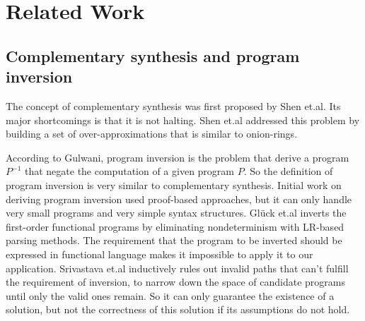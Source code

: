 \documentclass{acm_proc_article-sp}
\begin{document}


\section{Related Work}\label{sec_relwork}
\subsection{Complementary synthesis and program inversion}
The concept of complementary synthesis was first proposed by Shen et.al\cite{ShengYuShen:iccad09,ShengYuShen:tcad}.
Its major shortcomings is that it is not halting.
Shen et.al\cite{ShengYuShen:fmcad10} addressed this problem by building a set of over-approximations that is similar to onion-rings.

According to Gulwani\cite{dim_syn},
program inversion is the problem that derive a program $P^{-1}$
that negate the computation of a given program $P$.
So the definition of program inversion is very similar to complementary synthesis.
Initial work on deriving program inversion used proof-based approaches\cite{prog_inv},
but it can only handle very small programs and very simple syntax structures.
Gl\"{u}ck et.al \cite{mtd_autoProginv} inverts the first-order functional programs
by eliminating nondeterminism with LR-based parsing methods.
The requirement that the program to be inverted should be expressed in functional language makes it impossible to apply it to our application.
Srivastava et.al \cite{prog_inv_rev} inductively rules out invalid paths that can't fulfill the requirement of inversion,
to narrow down the space of candidate programs until only the valid ones remain.
So it can only guarantee the existence of a solution,
but not the correctness of this solution if its assumptions do not hold.
\end{document}
